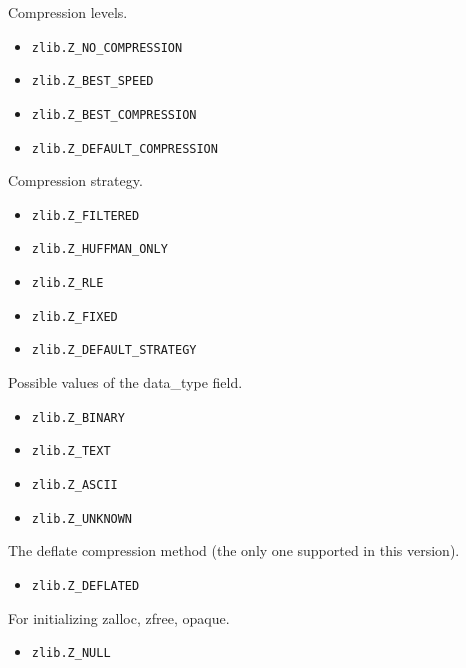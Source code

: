 Compression levels.

\begin{itemize}
\item
  \texttt{zlib.Z\_NO\_COMPRESSION}
\item
  \texttt{zlib.Z\_BEST\_SPEED}
\item
  \texttt{zlib.Z\_BEST\_COMPRESSION}
\item
  \texttt{zlib.Z\_DEFAULT\_COMPRESSION}
\end{itemize}

Compression strategy.

\begin{itemize}
\item
  \texttt{zlib.Z\_FILTERED}
\item
  \texttt{zlib.Z\_HUFFMAN\_ONLY}
\item
  \texttt{zlib.Z\_RLE}
\item
  \texttt{zlib.Z\_FIXED}
\item
  \texttt{zlib.Z\_DEFAULT\_STRATEGY}
\end{itemize}

Possible values of the data\_type field.

\begin{itemize}
\item
  \texttt{zlib.Z\_BINARY}
\item
  \texttt{zlib.Z\_TEXT}
\item
  \texttt{zlib.Z\_ASCII}
\item
  \texttt{zlib.Z\_UNKNOWN}
\end{itemize}

The deflate compression method (the only one supported in this version).

\begin{itemize}
\item
  \texttt{zlib.Z\_DEFLATED}
\end{itemize}

For initializing zalloc, zfree, opaque.

\begin{itemize}
\item
  \texttt{zlib.Z\_NULL}
\end{itemize}
